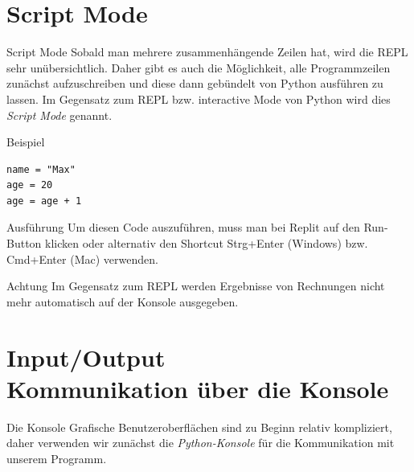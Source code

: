 \section{Script Mode}
\begin{frame}
\begin{block}{Script Mode}
	\vspace{2pt}
	Sobald man mehrere zusammenhängende Zeilen hat, wird die REPL sehr unübersichtlich. Daher gibt es auch die Möglichkeit, alle Programmzeilen zunächst aufzuschreiben und diese dann gebündelt von Python ausführen zu lassen. Im Gegensatz zum REPL bzw. interactive Mode von Python wird dies \emph{Script Mode} genannt.    
\end{block}
\end{frame}

\begin{fragile}[]
\begin{exampleblock}{Beispiel}
\begin{verbatim}
name = "Max"
age = 20
age = age + 1
\end{verbatim}
\end{exampleblock}

\vspace{12pt}

\pause
\begin{block}{Ausführung}
\vspace{2pt}
Um diesen Code auszuführen, muss man bei Replit auf den Run-Button klicken oder alternativ den Shortcut Strg+Enter (Windows) bzw. Cmd+Enter (Mac) verwenden.  
\end{block}

\vspace{12pt}

\pause

\begin{alertblock}{Achtung}
\vspace{2pt}
Im Gegensatz zum REPL werden Ergebnisse von Rechnungen nicht mehr automatisch auf der Konsole ausgegeben. 
\end{alertblock}

\end{fragile}



\section{Input/Output \\ \footnotesize Kommunikation über die Konsole}


\begin{frame}

\begin{block}{Die Konsole}
\vspace{2pt}
Grafische Benutzeroberflächen sind zu Beginn relativ kompliziert, daher verwenden wir zunächst die \emph{Python-Konsole} für die Kommunikation mit unserem Programm. 
\end{block}

\end{frame}

